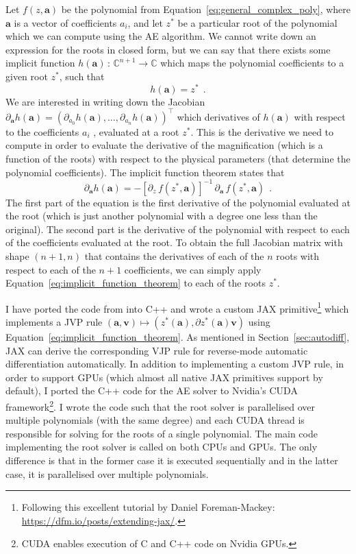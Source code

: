 \documentclass[12pt,dvipsnames]{report}
\newcommand{\ssf}[1]{\textsf{#1}}
\renewcommand{\vec}[1]{\boldsymbol{\mathbf{#1}}}
\newcommand{\hquad}{~~}
\begin{document}
Let $f(z, \vec{a})$ be the polynomial from Equation~\ref{eq:general_complex_poly}, where 
$\vec{a}$ is a vector of coefficients $a_i$, and let $z^*$ be a particular root of the 
polynomial which we can compute using the AE algorithm. We cannot write down an
expression for the roots in closed form, but we can say that there exists some
implicit function $h(\vec a)\,:\,\mathbb{C}^{n+1}\rightarrow\mathbb{C}$ which maps the 
polynomial coefficients to a given root $z^*$, such that
\begin{equation}
    h(\vec{a})=z^*
    \hquad .
\end{equation}
 We are interested in writing down the
Jacobian $\partial_{\vec a} h(\vec{a})=(\partial_{a_0} h(\vec a),\ldots,\partial_{a_n} h(\vec{a}))^\intercal$ 
which derivatives of $h(\vec{a})$ with respect to the
coefficients $a_i$ , evaluated at a root $z^*$. This is the derivative we need 
to compute in order to evaluate the derivative of the magnification
(which is a function of the roots) with respect to the physical parameters
(that determine the polynomial coefficients). The implicit function theorem
states that
\begin{equation}
    \partial_{\vec a}h(\vec{a})=-\left[\partial_z\,f(z^*,\vec{a})\right]^{-1}\,\partial_{\vec a}\,f (z^*,\vec a) 
    \hquad .
    \label{eq:implicit_function_theorem}
\end{equation}
The first part of the equation is the first derivative of the polynomial evaluated at the
root (which is just another polynomial with a degree one less than the original).
The second part is the derivative of the polynomial with respect to each of the
coefficients evaluated at the root. To obtain the full Jacobian matrix  with shape 
$(n+1, n)$ that contains the  derivatives of each of the $n$ roots with respect to each of 
the $n+1$ coefficients, we can simply apply Equation~\ref{eq:implicit_function_theorem} 
to each of the roots $z^*$. 

I have ported the code from \citet{cameron2021} into \ssf{C++} and wrote a custom \ssf{JAX}
primitive\footnote{Following this excellent tutorial by Daniel Foreman-Mackey: 
\url{https://dfm.io/posts/extending-jax/}.} which implements a JVP rule 
$\left(\vec{a}, \vec v\right) \mapsto\left(z^{*}\left(\vec a\right), \partial z^{*}\left(\vec a\right) \vec v\right)$
using Equation~\ref{eq:implicit_function_theorem}. As mentioned
in Section~\ref{sec:autodiff}, \ssf{JAX} can derive the corresponding VJP rule for 
reverse-mode automatic differentiation automatically. In addition to implementing a 
custom JVP rule, in order to support GPUs (which almost all native \ssf{JAX} primitives 
support by default), I ported the \ssf{C++} code  for the AE solver to Nvidia's 
\ssf{CUDA} framework\footnote{\ssf{CUDA} enables execution 
of \ssf{C} and \ssf{C++} code on Nvidia GPUs.}. I wrote the code such that the root 
solver is parallelised over multiple polynomials (with the same degree) and each \ssf{CUDA} thread is 
responsible for solving for the roots of a single polynomial. The main code implementing the root solver is
called on both CPUs and GPUs.
The only difference is that in the former case it is 
executed sequentially and in the latter case, it is parallelised over multiple polynomials. 
\end{document}
